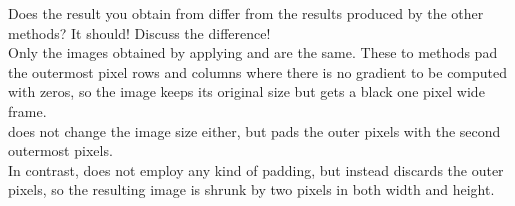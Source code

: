 Does the result you obtain from  differ from the results produced by the other methods? It should! Discuss the difference!
\color{blue} \\[1ex]
Only the images obtained by applying  and  are the same. These to methods pad the outermost pixel rows and columns where there is no gradient to be computed with zeros, so the image keeps its original size but gets a black one pixel wide frame. \\
 does not change the image size either, but pads the outer pixels with the second outermost pixels. \\
In contrast,  does not employ any kind of padding, but instead discards the outer pixels, so the resulting image is shrunk by two pixels in both width and height.
\color{black}

